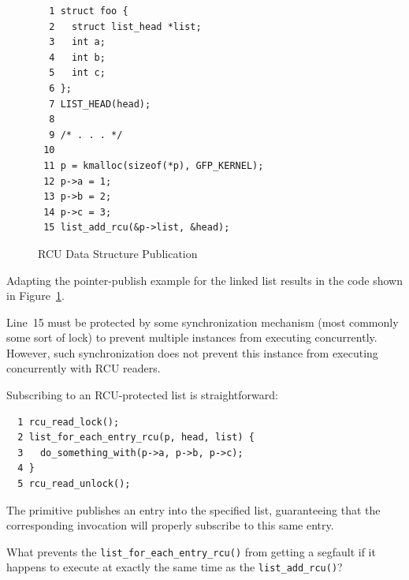 \begin{figure}[tbp]
{ \scriptsize
\begin{verbatim}
  1 struct foo {
  2   struct list_head *list;
  3   int a;
  4   int b;
  5   int c;
  6 };
  7 LIST_HEAD(head);
  8
  9 /* . . . */
 10
 11 p = kmalloc(sizeof(*p), GFP_KERNEL);
 12 p->a = 1;
 13 p->b = 2;
 14 p->c = 3;
 15 list_add_rcu(&p->list, &head);
\end{verbatim}
}
\caption{RCU Data Structure Publication}
\label{fig:defer:RCU Data Structure Publication}
\end{figure}

Adapting the pointer-publish example for the linked list results in
the code shown in
Figure~\ref{fig:defer:RCU Data Structure Publication}.

Line~15 must be protected by some synchronization mechanism (most
commonly some sort of lock) to prevent multiple 
instances from executing concurrently.
However, such synchronization does not prevent this 
instance from executing concurrently with RCU readers.

Subscribing to an RCU-protected list is straightforward:

\vspace{5pt}
\begin{minipage}[t]{\columnwidth}
\scriptsize
\begin{verbatim}
  1 rcu_read_lock();
  2 list_for_each_entry_rcu(p, head, list) {
  3   do_something_with(p->a, p->b, p->c);
  4 }
  5 rcu_read_unlock();
\end{verbatim}
\end{minipage}
\vspace{5pt}

The  primitive publishes
an entry into the specified list, guaranteeing that the corresponding
 invocation will properly
subscribe to this same entry.

\QuickQuiz{}
	What prevents the {\tt list\_for\_each\_entry\_rcu()} from
	getting a segfault if it happens to execute at exactly the same
	time as the {\tt list\_add\_rcu()}?
 \QuickQuizEnd

